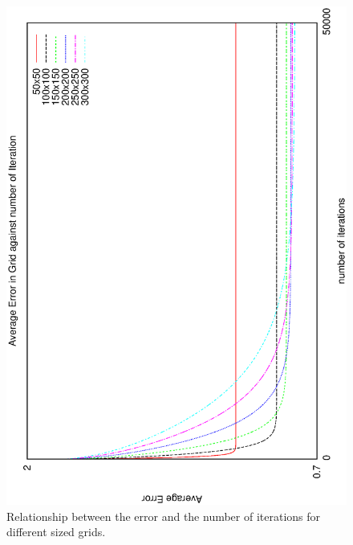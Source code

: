 \documentclass[aps,twocolumn,pre,nofootinbib]{revtex4}
\begin{document}
\begin{figure}
\includegraphics[height=\breite \columnwidth,angle=-90]{finite_diff_conv.eps}

\caption{Relationship between the error and the number of iterations for different sized grids.}
\label{fig:fd}
\end{figure}
\end{document}
